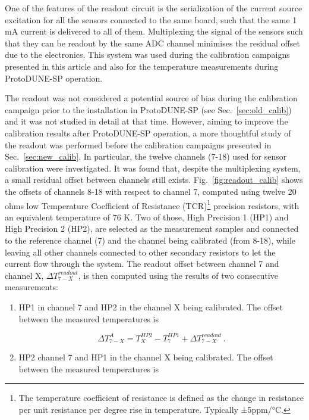 \noindent
One of the features of the readout circuit is the serialization of the current source excitation for all the sensors connected to the same board, such that the same 1 mA current is delivered to all of them. Multiplexing the signal of the sensors such that they can be readout by the same ADC channel minimises the residual offset due to the electronics. This system was used during the calibration campaigns presented in this article and also for the temperature measurements during ProtoDUNE-SP operation. 

The readout was not considered a potential source of bias during the calibration campaign prior to the installation in ProtoDUNE-SP (see Sec.~\ref{sec:old_calib}) and it was not studied in detail at that time. However, aiming to improve the calibration results after ProtoDUNE-SP operation, a more thoughtful study of the readout was performed before the calibration campaigns presented in Sec.~\ref{sec:new_calib}. In particular, the twelve channels (7-18) used for sensor calibration were investigated. It was found that, despite the multiplexing system, a small residual offset between channels still exists. Fig.~\ref{fig:readout_calib} shows the offsets of channels 8-18 with respect to channel 7, computed using twelve 20 ohms low Temperature Coefficient of Resistance (TCR)\footnote{The temperature coefficient of resistance is defined as the change in resistance per unit resistance per degree rise in temperature. Typically ±5ppm/°C.} precision resistors, with an equivalent temperature of 76 K. Two of those, High Precision 1 (HP1) and High Precision 2 (HP2), are selected as the measurement samples and connected to the reference channel (7) and the channel being calibrated (from 8-18), while leaving all other channels connected to other secondary resistors to let the current flow through the system. The readout offset between channel 7 and channel X, $\Delta T_{7-X}^{readout}$, is then computed using the results of two consecutive measurements:

\begin{enumerate}%
    \item HP1 in channel 7 and HP2 in the channel X being calibrated. The offset between the measured temperatures is 

    \begin{equation}
        \Delta T_{7-X}^A = T_{X}^{HP2}-T_{7}^{HP1}+\Delta T_{7-X}^{readout} \, .
    \end{equation}  
    
    \item HP2 channel 7 and HP1 in the channel X being calibrated. The offset between the measured temperatures is
\end{enumerate}

